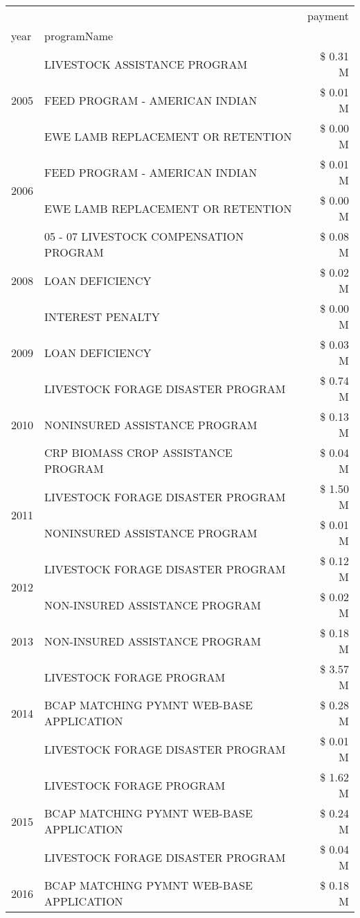 \begin{tabular}{llr}
\toprule
 &  & payment \\
year & programName &  \\
\midrule
\multirow[t]{3}{*}{2005} & LIVESTOCK ASSISTANCE PROGRAM & \$ 0.31 M \\
 & FEED PROGRAM - AMERICAN INDIAN & \$ 0.01 M \\
 & EWE LAMB REPLACEMENT OR RETENTION & \$ 0.00 M \\
\cline{1-3}
\multirow[t]{2}{*}{2006} & FEED PROGRAM - AMERICAN INDIAN & \$ 0.01 M \\
 & EWE LAMB REPLACEMENT OR RETENTION & \$ 0.00 M \\
\cline{1-3}
\multirow[t]{3}{*}{2008} & 05 - 07 LIVESTOCK COMPENSATION PROGRAM & \$ 0.08 M \\
 & LOAN DEFICIENCY & \$ 0.02 M \\
 & INTEREST PENALTY & \$ 0.00 M \\
\cline{1-3}
2009 & LOAN DEFICIENCY & \$ 0.03 M \\
\cline{1-3}
\multirow[t]{3}{*}{2010} & LIVESTOCK FORAGE DISASTER PROGRAM & \$ 0.74 M \\
 & NONINSURED ASSISTANCE PROGRAM & \$ 0.13 M \\
 & CRP BIOMASS CROP ASSISTANCE PROGRAM & \$ 0.04 M \\
\cline{1-3}
\multirow[t]{2}{*}{2011} & LIVESTOCK FORAGE DISASTER PROGRAM & \$ 1.50 M \\
 & NONINSURED ASSISTANCE PROGRAM & \$ 0.01 M \\
\cline{1-3}
\multirow[t]{2}{*}{2012} & LIVESTOCK FORAGE DISASTER PROGRAM & \$ 0.12 M \\
 & NON-INSURED ASSISTANCE PROGRAM & \$ 0.02 M \\
\cline{1-3}
2013 & NON-INSURED ASSISTANCE PROGRAM & \$ 0.18 M \\
\cline{1-3}
\multirow[t]{3}{*}{2014} & LIVESTOCK FORAGE PROGRAM & \$ 3.57 M \\
 & BCAP MATCHING PYMNT WEB-BASE APPLICATION & \$ 0.28 M \\
 & LIVESTOCK FORAGE DISASTER PROGRAM & \$ 0.01 M \\
\cline{1-3}
\multirow[t]{3}{*}{2015} & LIVESTOCK FORAGE PROGRAM & \$ 1.62 M \\
 & BCAP MATCHING PYMNT WEB-BASE APPLICATION & \$ 0.24 M \\
 & LIVESTOCK FORAGE DISASTER PROGRAM & \$ 0.04 M \\
\cline{1-3}
\multirow[t]{2}{*}{2016} & BCAP MATCHING PYMNT WEB-BASE APPLICATION & \$ 0.18 M \\

\end{tabular}
